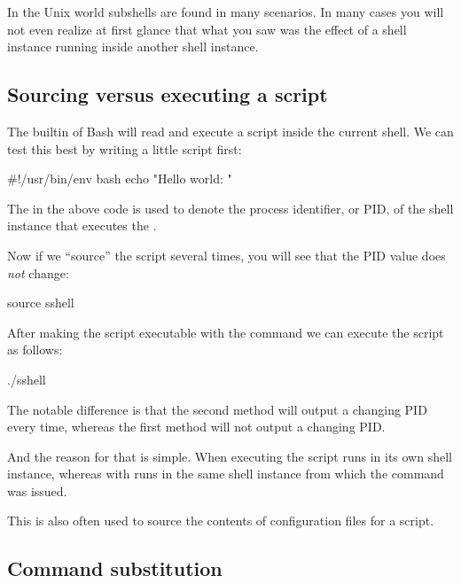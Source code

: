 \documentclass{olli-handout}
\begin{document}
In the Unix world subshells are found in many scenarios. In many cases you will not even realize at first glance that what you saw was the effect of a shell instance running inside another shell instance.

\subsection{Sourcing versus executing a script}\label{sourcing}

The  builtin of Bash will read and execute a script inside the current shell. We can test this best by writing a little script first:

\begin{lstbash}
#!/usr/bin/env bash
echo "Hello world: $$"
\end{lstbash}

The \TTQ{\textdollar\textdollar} in the above code is used to denote the process identifier, or PID, of the shell instance that executes the .

Now if we ``source'' the script several times, you will see that the PID value does \emph{not} change:

\begin{lstbash}
source sshell
\end{lstbash}

After making the script executable with the command  we can execute the script as follows:

\begin{lstbash}
./sshell
\end{lstbash}

The notable difference is that the second method will output a changing PID every time, whereas the first method will not output a changing PID.

And the reason for that is simple. When executing  the script runs in its own shell instance, whereas with  runs in the same shell instance from which the  command was issued.

\begin{hintbox}
    {\olliPenR} This is also often used to source the contents of configuration files for a script.
\end{hintbox}

\subsection{Command substitution}
\end{document}
